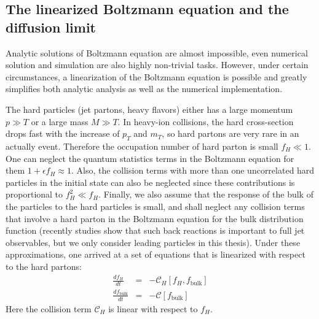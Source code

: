 \subsection{The linearized Boltzmann equation and the diffusion limit}
Analytic solutions of Boltzmann equation are almost impossible, even numerical solution and simulation are also highly non-trivial tasks.
However, under certain circumstances, a linearization of the Boltzmann equation is possible and greatly simplifies both analytic analysis as well as the numerical implementation.

The hard particles (jet partons, heavy flavors) either has a large momentum $p\gg T$ or a large mass $M \gg T$. 
In heavy-ion collisions, the hard cross-section drops fast with the increase of $p_T$ and $m_T$, so hard partons are very rare in an actually event. 
Therefore the occupation number of hard parton is small $f_H \ll 1$.
One can neglect the quantum statistics terms in the Boltzmann equation for them $1+\epsilon f_H \approx 1$.
Also, the collision terms with more than one uncorrelated hard particles in the initial state can also be neglected since these contributions is proportional to $f_H^2 \ll f_H$. 
Finally, we also assume that the response of the bulk of the particles to the hard particles is small, and shall neglect any collision terms that involve a hard parton in the Boltzmann equation for the bulk distribution function (recently studies show that such back reactions is important to full jet observables, but we only consider leading particles in this thesis).
Under these approximations, one arrived at a set of equations that is linearized with respect to the hard partons:
\begin{eqnarray}
\frac{df_H}{dt} &=& -\mathcal{C}_H[f_H, f_{\textrm{bulk}}] \label{eq:hard-bulk-eq}\\
\frac{df_{\textrm{bulk}}}{dt} &=& -\mathcal{C}[f_{\textrm{bulk}}]
\end{eqnarray}
Here the collision term $\mathcal{C}_H$ is linear with respect to $f_H$.


